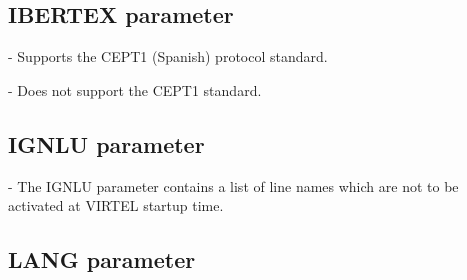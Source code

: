 \documentclass[letterpaper,10pt,english]{sphinxmanual}
\begin{document}
\subsection{IBERTEX parameter}
\label{\detokenize{Installation_Guide:ibertex-parameter}}\label{\detokenize{Installation_Guide:index-82}}
\begin{sphinxVerbatim}[commandchars=\\\{\}]
                      
\end{sphinxVerbatim}

 - Supports the CEPT1 (Spanish) protocol standard.

 - Does not support the CEPT1 standard.

\ignorespaces 

\subsection{IGNLU parameter}
\label{\detokenize{Installation_Guide:ignlu-parameter}}\label{\detokenize{Installation_Guide:index-83}}
\begin{sphinxVerbatim}[commandchars=\\\{\}]
            
\end{sphinxVerbatim}

 - The IGNLU parameter contains a list of line names which are not to be activated at VIRTEL startup time.

\ignorespaces 

\subsection{LANG parameter}
\label{\detokenize{Installation_Guide:lang-parameter}}\label{\detokenize{Installation_Guide:index-84}}
\begin{sphinxVerbatim}[commandchars=\\\{\}]
                             
\end{sphinxVerbatim}
\end{document}
